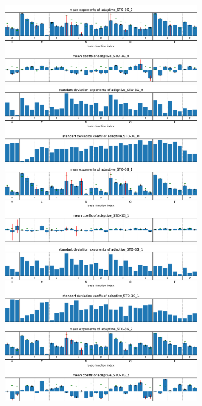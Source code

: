 \begin{figure}
    \includegraphics[width=0.75\textwidth]{chapters/results/results_images/adaptive_basis_functions/mean_exps_and_coeffsadaptive_STO-3G_0}
    \includegraphics[width=0.75\textwidth]{chapters/results/results_images/adaptive_basis_functions/std_exps_and_coeffsadaptive_STO-3G_0}
    \includegraphics[width=0.75\textwidth]{chapters/results/results_images/adaptive_basis_functions/mean_exps_and_coeffsadaptive_STO-3G_1}
    \includegraphics[width=0.75\textwidth]{chapters/results/results_images/adaptive_basis_functions/std_exps_and_coeffsadaptive_STO-3G_1}
    \includegraphics[width=0.75\textwidth]{chapters/results/results_images/adaptive_basis_functions/mean_exps_and_coeffsadaptive_STO-3G_2}

\end{figure}
